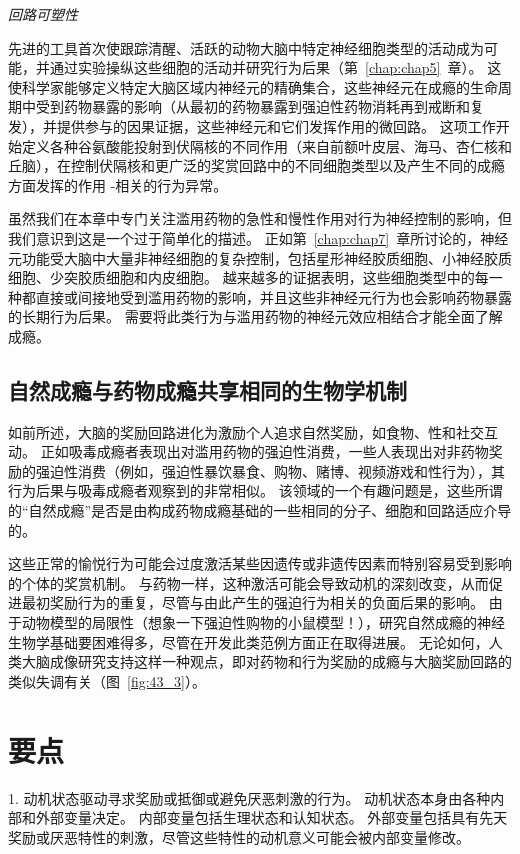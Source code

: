 \textit{回路可塑性}

先进的工具首次使跟踪清醒、活跃的动物大脑中特定神经细胞类型的活动成为可能，并通过实验操纵这些细胞的活动并研究行为后果（第~\ref{chap:chap5}~章）。
这使科学家能够定义特定大脑区域内神经元的精确集合，这些神经元在成瘾的生命周期中受到药物暴露的影响（从最初的药物暴露到强迫性药物消耗再到戒断和复发），并提供参与的因果证据，这些神经元和它们发挥作用的微回路。
这项工作开始定义各种谷氨酸能投射到伏隔核的不同作用（来自前额叶皮层、海马、杏仁核和丘脑），在控制伏隔核和更广泛的奖赏回路中的不同细胞类型以及产生不同的成瘾方面发挥的作用 -相关的行为异常。


虽然我们在本章中专门关注滥用药物的急性和慢性作用对行为神经控制的影响，但我们意识到这是一个过于简单化的描述。
正如第~\ref{chap:chap7}~章所讨论的，神经元功能受大脑中大量非神经细胞的复杂控制，包括星形神经胶质细胞、小神经胶质细胞、少突胶质细胞和内皮细胞。
越来越多的证据表明，这些细胞类型中的每一种都直接或间接地受到滥用药物的影响，并且这些非神经元行为也会影响药物暴露的长期行为后果。
需要将此类行为与滥用药物的神经元效应相结合才能全面了解成瘾。



\subsection{自然成瘾与药物成瘾共享相同的生物学机制}

如前所述，大脑的奖励回路进化为激励个人追求自然奖励，如食物、性和社交互动。
正如吸毒成瘾者表现出对滥用药物的强迫性消费，一些人表现出对非药物奖励的强迫性消费（例如，强迫性暴饮暴食、购物、赌博、视频游戏和性行为），其行为后果与吸毒成瘾者观察到的非常相似。
该领域的一个有趣问题是，这些所谓的“自然成瘾”是否是由构成药物成瘾基础的一些相同的分子、细胞和回路适应介导的。


这些正常的愉悦行为可能会过度激活某些因遗传或非遗传因素而特别容易受到影响的个体的奖赏机制。
与药物一样，这种激活可能会导致动机的深刻改变，从而促进最初奖励行为的重复，尽管与由此产生的强迫行为相关的负面后果的影响。
由于动物模型的局限性（想象一下强迫性购物的小鼠模型！），研究自然成瘾的神经生物学基础要困难得多，尽管在开发此类范例方面正在取得进展。
无论如何，人类大脑成像研究支持这样一种观点，即对药物和行为奖励的成瘾与大脑奖励回路的类似失调有关（图~\ref{fig:43_3}）。



\section{要点}

1. 动机状态驱动寻求奖励或抵御或避免厌恶刺激的行为。
动机状态本身由各种内部和外部变量决定。
内部变量包括生理状态和认知状态。
外部变量包括具有先天奖励或厌恶特性的刺激，尽管这些特性的动机意义可能会被内部变量修改。


